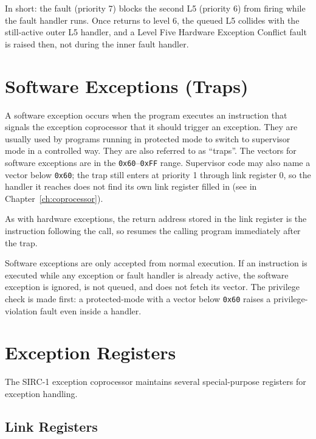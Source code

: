 In short: the fault (priority 7) blocks the second L5 (priority 6) from firing while the fault handler runs. Once
 returns to level 6, the queued L5 collides with the still-active outer L5 handler, and a Level Five
Hardware Exception Conflict fault is raised then, not during the inner fault handler.

\section{Software Exceptions (Traps)}
\label{sec:user-exceptions}

A software exception occurs when the program executes an  instruction that signals the exception
coprocessor that it should trigger an exception. They are usually used by programs running in protected mode to switch
to supervisor mode in a controlled way. They are also referred to as ``traps''. The vectors for software exceptions are
in the \texttt{0x60}--\texttt{0xFF} range. Supervisor code may also name a vector below \texttt{0x60}; the trap still
enters at priority 1 through link register 0, so the handler it reaches does not find its own link register filled in
(see  in Chapter~\ref{ch:coprocessor}).

As with hardware exceptions, the return address stored in the link register is the instruction following the
 call, so  resumes the calling program immediately after the trap.

Software exceptions are only accepted from normal execution. If an  instruction is executed while any
exception or fault handler is already active, the software exception is ignored, is not queued, and does not fetch its
vector. The privilege check is made first: a protected-mode  with a vector below \texttt{0x60} raises a
privilege-violation fault even inside a handler.

\section{Exception Registers}

The SIRC-1 exception coprocessor maintains several special-purpose registers for exception handling.

\subsection{Link Registers}
\label{sec:link-registers}

